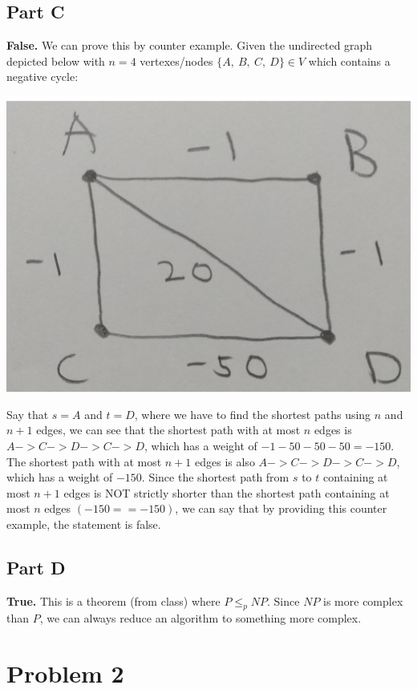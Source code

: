 \documentclass[12pt]{article}
\begin{document}
\subsection*{Part C}
\textbf{False.} We can prove this by counter example.
Given the undirected graph depicted below with $n=4$ vertexes/nodes $\{A,\ B,\ C,\ D\} \in V$ which contains a negative cycle:
\newline
\begin{center}
    \includegraphics[scale=0.05, angle=0]{hi2.jpg}
\end{center}
Say that $s=A$ and $t=D$, where we have to find the shortest paths using $n$ and $n+1$ edges, we can see that the shortest path
with at most $n$ edges is $A->C->D->C->D$, which has a weight of $-1-50-50-50=-150$. The shortest path with at most $n+1$ edges is also $A->C->D->C->D$,
which has a weight of $-150$. Since the shortest path from $s$ to $t$ containing at most $n+1$ edges is NOT strictly shorter than the
shortest path containing at most $n$ edges $(-150==-150)$, we can say that by providing this counter example, the statement is false.

\subsection*{Part D}
\textbf{True.} This is a theorem (from class) where $P \leq_p NP$. Since $NP$ is more complex than $P$, we can always reduce an algorithm to something 
more complex.

\newpage
\section*{Problem 2}
\end{document}
